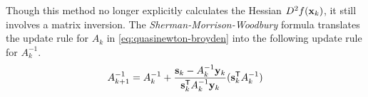 Though this method no longer explicitly calculates the Hessian $D^{2}f(\mathbf{x}_k)$, it still involves a matrix inversion.
The \emph{Sherman-Morrison-Woodbury} formula translates the update rule for $A_k$ in \eqref{eq:quasinewton-broyden} into the following update rule for $A_k^{-1}$.
\[
A_{k+1}^{-1} = A_{k}^{-1} + \frac{\mathbf{s}_k - A_{k}^{-1}\mathbf{y}_k}{\mathbf{s}_k^{\mathsf T}  A_{k}^{-1}\mathbf{y}_k} (\mathbf{s}_k^{\mathsf T}  A_{k}^{-1})
\]

